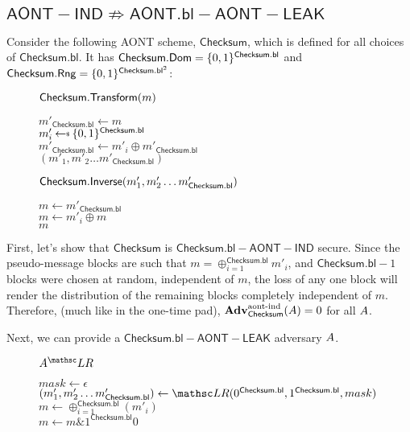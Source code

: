 \documentclass[11pt,twoside]{article}
\begin{document}
\subsection{$\mathsf{AONT-IND} \not\Rightarrow \mathsf{AONT.bl-AONT-LEAK}$}

Consider the following AONT scheme, $\mathsf{Checksum}$, which is defined for all choices of $\mathsf{Checksum.bl}$. It has $\mathsf{Checksum.Dom}=\{0,1\}^{\mathsf{Checksum.bl}}$ and $\mathsf{Checksum.Rng}=\{0,1\}^{\mathsf{Checksum.bl}^2}$:

\begin{figure}[H]
{
\underline{$\mathsf{Checksum.Transform}(m)$}
\begin{algorithm}[H]
$m'_\mathsf{Checksum.bl}\gets m$\\
{
$m'_i\getsr \bits^\mathsf{Checksum.bl}$\\
$m'_\mathsf{Checksum.bl}\gets m'_i \oplus m'_\mathsf{Checksum.bl}$\\
}
\Return $(m'_1,m'_2\dots m'_\mathsf{Checksum.bl})$
\end{algorithm}
}
{
\underline{$\mathsf{Checksum.Inverse}(m'_1,m'_2\dots m'_\mathsf{Checksum.bl})$}

\begin{algorithm}[H]
$m\gets m'_\mathsf{Checksum.bl}$\\
{
$m\gets m'_i \oplus m$\\
}
\Return $m$ 
\end{algorithm}
}
\end{figure} 

First, let's show that $\mathsf{Checksum}$ is $\mathsf{Checksum.bl-AONT-IND}$ secure. Since the pseudo-message blocks are such that $m=\oplus_{i=1}^\mathsf{Checksum.bl} m'_i$, and $\mathsf{Checksum.bl}-1$ blocks were chosen at random, independent of $m$, the loss of any one block will render the distribution of the remaining blocks completely independent of $m$. Therefore, (much like in the one-time pad), $\textbf{Adv}^\text{aont-ind}_{\mathsf{Checksum}}(A)=0$ for all $A$.

Next, we can provide a $\mathsf{Checksum.bl-AONT-LEAK}$ adversary $A$. 

\begin{figure}[H]
{
\underline{$\advA^\LRO$}

\begin{algorithm}[H]
$mask\gets \epsilon$ 
$(m'_1,m'_2\dots m'_\mathsf{Checksum.bl})\gets \LRO(0^\mathsf{Checksum.bl},1^\mathsf{Checksum.bl},mask)$\\
$m\gets \oplus_{i=1}^\mathsf{Checksum.bl}(m'_i)$\\
$m\gets m \mathrel{\&} 1^\mathsf{Checksum.bl}0$\\
\end{algorithm}
}
\end{figure}
\end{document}
